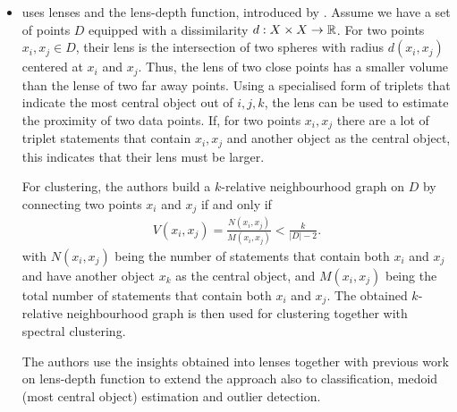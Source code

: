 \begin{itemize}
    \item \cite{kleindessnerLensDepthFunction2017} uses lenses and the lens-depth function, 
        introduced by \cite{liuLensDataDepth2011}. Assume we have a set of points $D$ equipped
        with a dissimilarity $d: X \times X \to \mathbb{R}$. 
        For two points $x_i, x_j \in D$, their lens is the intersection of two
        spheres with radius $d(x_i, x_j)$ centered at $x_i$ and $x_j$. 
        Thus, the lens of two close points has a smaller volume than the lense of
        two far away points. Using a specialised form of triplets that
        indicate the most central object out of $i,j,k$, the lens can be used to 
        estimate the proximity of two data points. If, for two points $x_i, x_j$ there are 
        a lot of triplet statements that contain $x_i, x_j$ and another object as the central 
        object, this indicates that their lens must be larger. 

        For clustering, the authors 
        build a $k$-relative neighbourhood graph on $D$ by connecting two points $x_i$ and $x_j$
        if and only if
        \begin{align*}
            V(x_i, x_j) = \frac{N(x_i, x_j)}{M(x_i, x_j)}  < \frac{k}{\left| D \right| - 2}
        .\end{align*}
        with $N(x_i, x_j)$ being the number of statements that contain both $x_i$ and $x_j$ and
        have another object $x_k$ as the central object, and $M(x_i, x_j)$ being
        the total number of statements that contain both $x_i$ and $x_j$.  
        The obtained $k$-relative neighbourhood graph is then used for clustering 
        together with spectral clustering.

        The authors use the insights obtained into lenses together with previous work on 
        lens-depth function to extend the approach also to classification, 
        medoid (most central object) estimation and outlier detection.
         



\end{itemize}
